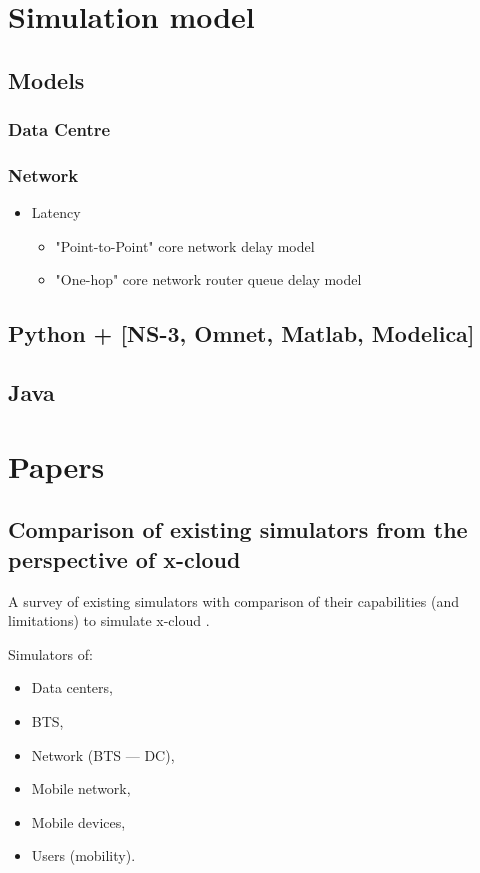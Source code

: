 \documentclass[conference]{IEEEtran}
\newcommand{\xcloud}{x-cloud }
\begin{document}
\section{Simulation model}

\subsection{Models}

\subsubsection{Data Centre}
\cite{5959161}

\subsubsection{Network}
\begin{itemize}
\item Latency
\begin{itemize}
\item "Point-to-Point" core network delay model \cite{choi2007analysis}
\item "One-hop" core network router queue delay model  \cite{papagiannaki2003measurement}
\end{itemize}
\end{itemize}

\subsection{Python + [NS-3, Omnet, Matlab, Modelica]}

\subsection{Java}

\section{Papers}

\subsection{Comparison of existing simulators from the perspective of  \xcloud}
A survey of existing simulators with comparison of their capabilities (and limitations) to simulate \xcloud.

Simulators of:
\begin{itemize}
\item Data centers,
\item BTS,
\item Network (BTS --- DC),
\item Mobile network,
\item Mobile devices,
\item Users (mobility).
\end{itemize}
\end{document}

